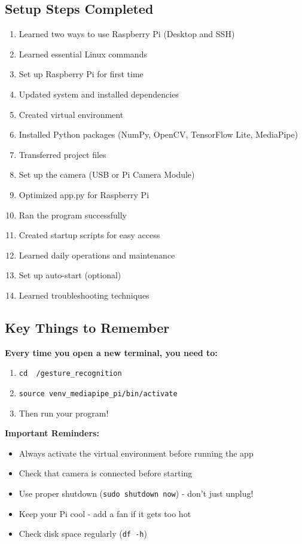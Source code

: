 \documentclass[12pt,a4paper]{article}
\begin{document}
\subsection{Setup Steps Completed}

\begin{enumerate}
    \item Learned two ways to use Raspberry Pi (Desktop and SSH)
    \item Learned essential Linux commands
    \item Set up Raspberry Pi for first time
    \item Updated system and installed dependencies
    \item Created virtual environment
    \item Installed Python packages (NumPy, OpenCV, TensorFlow Lite, MediaPipe)
    \item Transferred project files
    \item Set up the camera (USB or Pi Camera Module)
    \item Optimized app.py for Raspberry Pi
    \item Ran the program successfully
    \item Created startup scripts for easy access
    \item Learned daily operations and maintenance
    \item Set up auto-start (optional)
    \item Learned troubleshooting techniques
\end{enumerate}

\subsection{Key Things to Remember}

\begin{tipbox}
\textbf{Every time you open a new terminal, you need to:}
\begin{enumerate}
    \item \texttt{cd ~/gesture\_recognition}
    \item \texttt{source venv\_mediapipe\_pi/bin/activate}
    \item Then run your program!
\end{enumerate}
\end{tipbox}

\begin{warningbox}
\textbf{Important Reminders:}
\begin{itemize}
    \item Always activate the virtual environment before running the app
    \item Check that camera is connected before starting
    \item Use proper shutdown (\texttt{sudo shutdown now}) - don't just unplug!
    \item Keep your Pi cool - add a fan if it gets too hot
    \item Check disk space regularly (\texttt{df -h})
\end{itemize}
\end{warningbox}
\end{document}
